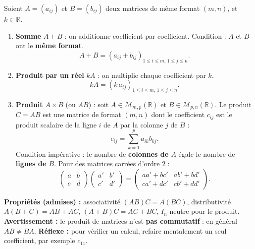\documentclass[11pt]{article}
\newcommand{\cle}[1]{{\popxbold\color{popdark}#1}}
\begin{document}
\begin{methode}
Soient $A=(a_{ij})$ et $B=(b_{ij})$ deux matrices de même format $(m,n)$, et $k\in\mathbb{R}$.
\begin{enumerate}
\item \textbf{Somme} $A+B$ : on additionne \cle{coefficient par coefficient}. Condition : $A$ et $B$ ont le \textbf{même format}.
\[ A+B=(a_{ij}+b_{ij})_{1\le i\le m,\,1\le j\le n}. \]
\item \textbf{Produit par un réel} $kA$ : on multiplie \cle{chaque coefficient} par $k$.
\[ kA=(k\,a_{ij})_{1\le i\le m,\,1\le j\le n}. \]
\item \textbf{Produit} $A\times B$ (ou $AB$) : soit $A\in\mathcal{M}_{m,p}(\mathbb{R})$ et $B\in\mathcal{M}_{p,n}(\mathbb{R})$. Le produit $C=AB$ est une matrice de format $(m,n)$ dont le coefficient $c_{ij}$ est le \cle{produit scalaire} de la ligne $i$ de $A$ par la colonne $j$ de $B$ :
\[ c_{ij}=\sum_{k=1}^{p} a_{ik}b_{kj}. \]
Condition impérative : le nombre de \textbf{colonnes de $A$} égale le nombre de \textbf{lignes de $B$}.
Pour des matrices carrées d'ordre $2$ :
\[ \begin{pmatrix} a & b \\ c & d \end{pmatrix}\begin{pmatrix} a' & b' \\ c' & d' \end{pmatrix}=\begin{pmatrix} aa'+bc' & ab'+bd' \\ ca'+dc' & cb'+dd' \end{pmatrix}. \]
\end{enumerate}
\textbf{Propriétés (admises) :} associativité $(AB)C=A(BC)$, distributivité $A(B+C)=AB+AC$, $(A+B)C=AC+BC$, $I_n$ neutre pour le produit.
\textbf{Avertissement :} le produit de matrices n'est \textbf{pas commutatif} : en général $AB\neq BA$.
\textbf{Réflexe :} pour vérifier un calcul, refaire mentalement un seul coefficient, par exemple $c_{11}$.
\end{methode}
\end{document}
